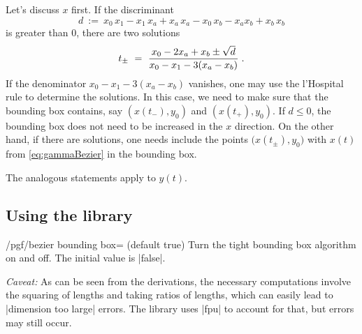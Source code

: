 Let's discuss $x$ first. If the discriminant
\begin{equation}
 d~:=~x_0\,x_1 - x_1\,x_a + x_a\,x_a - x_0\,x_b - x_a x_b +  x_b\,x_b
\end{equation}
is greater than 0, there are two solutions
\begin{equation}
 t_\pm~=~\frac{x_{0}-2x_{a}+x_{b}\pm\sqrt{d}}{%
 	x_{0}-x_{1}-3(x_{a}- x_{b})} \;.
\end{equation}  
If the denominator $x_{0}-x_{1}-3(x_{a}- x_{b})$  vanishes, one may use the
l'Hospital rule to determine the solutions.
In this case, we need to make sure that the bounding box contains, say
$(x(t_-),y_0)$ and $(x(t_+),y_0)$. If $d\le0$, the bounding box does not need to
be increased in the $x$ direction. On the other hand, if there are solutions,
one needs include the points $\bigl(x(t_\pm),y_0\bigr)$ with $x(t)$ from
\eqref{eq:gammaBezier} in the bounding box. 

The analogous statements apply to $y(t)$. 

\subsection{Using the library}

\begin{key}{/pgf/bezier bounding box= (default true)}
    Turn the tight bounding box algorithm on and off. The initial value is
	|false|.

	\emph{Caveat:} As can be seen from the derivations, the necessary
	computations involve the squaring of lengths and taking ratios of lengths,
	which can easily lead to |dimension too large| errors. The library uses
	|fpu| to account for that, but errors may still occur.
\end{key}


\begin{codeexample}[width=5cm]
\end{codeexample}

